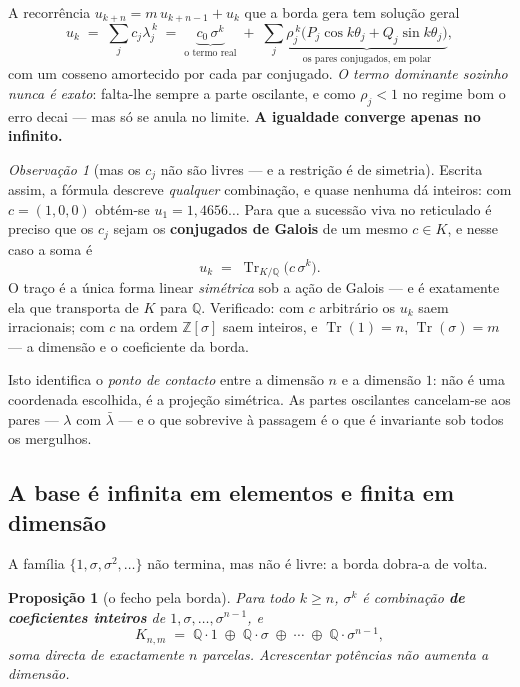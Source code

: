 \documentclass[11pt,a4paper]{article}
\theoremstyle{plain}
\newtheorem{proposicao}[teorema]{Proposição}
\theoremstyle{definition}
\theoremstyle{remark}
\newtheorem{obs}[teorema]{Observação}
\newcommand{\Q}{\mathbb{Q}}
\newcommand{\Z}{\mathbb{Z}}
\begin{document}
A recorrência $u_{k+n} = m\,u_{k+n-1} + u_k$ que a borda gera tem solução geral
\[
  u_k \;=\; \sum_{j} c_j \lambda_j^{\,k}
  \;=\; \underbrace{c_0\,\sigma^k}_{\text{o termo real}}
  \;+\; \sum_{j}\underbrace{\rho_j^{\,k}\big(P_j\cos k\theta_j + Q_j\sin k\theta_j\big)}_{\text{os pares conjugados, em polar}} ,
\]
com um cosseno amortecido por cada par conjugado. \emph{O termo dominante sozinho nunca é exato}:
falta-lhe sempre a parte oscilante, e como $\rho_j<1$ no regime bom o erro decai --- mas só se anula
no limite. \textbf{A igualdade converge apenas no infinito.}

\begin{obs}[mas os $c_j$ não são livres --- e a restrição é de simetria]
Escrita assim, a fórmula descreve \emph{qualquer} combinação, e quase nenhuma dá inteiros: com
$c=(1,0,0)$ obtém-se $u_1 = 1{,}4656\ldots$ Para que a sucessão viva no reticulado é preciso que os
$c_j$ sejam os \textbf{conjugados de Galois} de um mesmo $c\in K$, e nesse caso a soma é
\[
  u_k \;=\; \operatorname{Tr}_{K/\Q}\!\big(c\,\sigma^k\big) .
\]
O traço é a única forma linear \emph{simétrica} sob a ação de Galois --- e é exatamente ela que
transporta de $K$ para $\Q$. Verificado: com $c$ arbitrário os $u_k$ saem irracionais; com $c$ na
ordem $\Z[\sigma]$ saem inteiros, e $\operatorname{Tr}(1) = n$, $\operatorname{Tr}(\sigma) = m$ ---
a dimensão e o coeficiente da borda.
\end{obs}

\noindent Isto identifica o \emph{ponto de contacto} entre a dimensão $n$ e a dimensão $1$: não é
uma coordenada escolhida, é a projeção simétrica. As partes oscilantes cancelam-se aos pares
--- $\lambda$ com $\bar\lambda$ --- e o que sobrevive à passagem é o que é invariante sob todos os
mergulhos.


\subsection{A base é infinita em elementos e finita em dimensão}\label{sec:baseinf}

A família $\{1,\sigma,\sigma^2,\dots\}$ não termina, mas não é livre: a borda dobra-a de volta.

\begin{proposicao}[o fecho pela borda]\label{prop:fecho}
Para todo $k \geq n$, $\sigma^k$ é combinação \textbf{de coeficientes inteiros} de
$1,\sigma,\dots,\sigma^{n-1}$, e
\[
  K_{n,m} \;=\; \Q\cdot 1 \;\oplus\; \Q\cdot\sigma \;\oplus\;\cdots\;\oplus\; \Q\cdot\sigma^{n-1} ,
\]
soma directa de exactamente $n$ parcelas. Acrescentar potências não aumenta a dimensão.
\end{proposicao}
\end{document}
